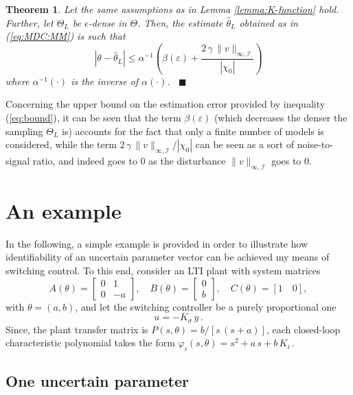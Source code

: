 \documentclass[letterpaper, 10 pt, conference]{ieeetran}
\def\qedp{\hspace*{\fill}~{\tiny $\blacksquare$}}
\newtheorem{theorem}{Theorem}
\begin{document}
\begin{theorem}
Let the same assumptions as in Lemma \ref{lemma:K-function} hold. Further, let $\Theta_L$ be $\epsilon$-dense in $\Theta$. Then, the estimate $\hat \theta_L$ obtained as in
(\ref{eq:MDC:MM}) is such that
\begin{equation}\label{eq:bound}
|\theta-\hat \theta_L | \le \alpha^{-1} \left ( \beta(\varepsilon) + \frac{2 \, \gamma \, \| v \|_{\infty,\mathcal I} }{| \chi_0 |} \right )
\end{equation}
where $\alpha^{-1}(\cdot)$ is the inverse of $\alpha(\cdot)$. \qedp
\end{theorem} 

Concerning the upper bound on the estimation error provided by inequality (\ref{eq:bound}), it can be seen that  the term $\beta(\varepsilon)$ 
(which decreases the denser the sampling $\Theta_L$ is) accounts
for the fact that only a finite number of models is considered, while the term
$2 \, \gamma \, \| v \|_{\infty,\mathcal I} / |\chi_0 | $ can be seen as a sort of noise-to-signal ratio, and indeed goes to $0$ as the disturbance $\| v \|_{\infty,\mathcal I}$ goes to $0$. 

\section{An example}


In the following, a simple example is provided in order to illustrate how identifiability of an uncertain parameter vector
can be achieved my means of switching control. To this end, consider an LTI plant with system matrices
\[
A(\theta) = \left [ \begin{array}{rr} 0 & 1 \\ 0 & -a \end {array} \right ] , \quad B(\theta) = \left [ \begin{array}{r}  0 \\ b \end {array} \right ]
, \quad C(\theta) = \left [ 1 \quad 0 \right ],
\]
with $\theta = (a , b)$, and let the switching controller be a purely proportional one
\[
u = - K_\sigma \, y \, .
\] 
Since, the plant transfer matrix is $P(s,\theta) = b / [s \, (s + a)]$, each closed-loop characteristic polynomial takes the form
$
\varphi_i (s,\theta) = s^2 + a \, s + b \, K_i \, .
$

\subsection{One uncertain parameter} 
\end{document}
